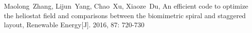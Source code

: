 \newpage
\appendix


\begin{thebibliography}{9}
Maolong~Zhang, Lijun~Yang, Chao~Xu, Xiaoze~Du, An efficient code to optimize the heliostat field and comparisons between the biomimetric spiral and staggered layout, Renewable Energy[J]. 2016, 87: 720-730
\end{thebibliography}
